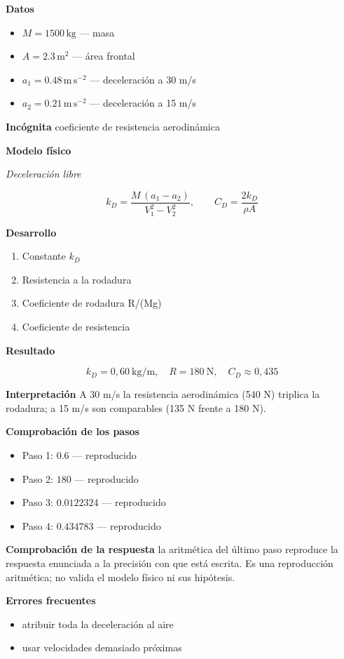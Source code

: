 \documentclass[10pt,openany]{book}
\begin{document}
\noindent\textbf{Datos}
\begin{itemize}
\item $M = 1500\,\mathrm{kg}$ — masa
\item $A = 2.3\,\mathrm{m}^{2}$ — área frontal
\item $a_{1} = 0.48\,\mathrm{m}\,\mathrm{s}^{-2}$ — deceleración a 30 m/s
\item $a_{2} = 0.21\,\mathrm{m}\,\mathrm{s}^{-2}$ — deceleración a 15 m/s
\end{itemize}

\noindent\textbf{Incógnita}
coeficiente de resistencia aerodinámica

\noindent\textbf{Modelo físico}

\noindent\textit{Deceleración libre}

\[
k_D = \frac{M\,(a_1 - a_2)}{V_1^{2} - V_2^{2}},\qquad C_D = \frac{2k_D}{\rho A}
\]

\noindent\textbf{Desarrollo}
\begin{enumerate}
\item
Constante \(k_D\)
\item
Resistencia a la rodadura
\item
Coeficiente de rodadura R/(Mg)
\item
Coeficiente de resistencia
\end{enumerate}

\noindent\textbf{Resultado}

\[
k_D = 0{,}60\ \mathrm{kg/m},\quad R = 180\ \mathrm{N},\quad C_D \approx 0{,}435
\]

\noindent\textbf{Interpretación}
A 30 m/s la resistencia aerodinámica (540 N) triplica la rodadura; a 15 m/s son comparables (135 N frente a 180 N).

\noindent\textbf{Comprobación de los pasos}
\begin{itemize}
\item Paso 1: $0.6$ — reproducido
\item Paso 2: $180$ — reproducido
\item Paso 3: $0.0122324$ — reproducido
\item Paso 4: $0.434783$ — reproducido
\end{itemize}

\noindent\textbf{Comprobación de la respuesta} la aritmética del último paso reproduce la respuesta enunciada a la precisión con que está escrita. Es una reproducción aritmética; no valida el modelo físico ni sus hipótesis.

\noindent\textbf{Errores frecuentes}
\begin{itemize}
\item atribuir toda la deceleración al aire
\item usar velocidades demasiado próximas
\end{itemize}
\end{document}
